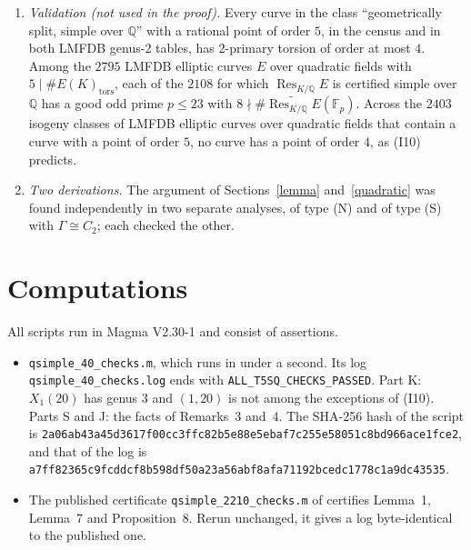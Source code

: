 \documentclass[11pt]{article}
\newcommand{\Q}{\mathbb Q}
\newcommand{\F}{\mathbb F}
\DeclareMathOperator{\Res}{Res}
\begin{document}
\begin{enumerate}
\item \emph{Validation (not used in the proof).} Every curve in the class ``geometrically split,
simple over \(\Q\)'' with a rational point of order \(5\), in the census and in both LMFDB genus-\(2\)
tables, has \(2\)-primary torsion of order at most \(4\). Among the \(2795\) LMFDB elliptic curves \(E\)
over quadratic fields with \(5\mid\#E(K)_{\mathrm{tors}}\), each of the \(2108\) for which
\(\Res_{K/\Q}E\) is certified simple over \(\Q\) has a good odd prime \(p\le23\) with
\(8\nmid\#\widetilde{\Res_{K/\Q}E}(\F_p)\). Across the
\(2403\) isogeny classes of LMFDB elliptic curves over quadratic fields that contain a curve with a
point of order \(5\), no curve has a point of order \(4\), as (I10) predicts.

\item \emph{Two derivations.} The argument of Sections~\ref{lemma} and~\ref{quadratic} was found
independently in two separate analyses, of type (N) and of type (S) with \(\Gamma\cong C_2\); each
checked the other.
\end{enumerate}

\section{Computations}\label{computations}

All scripts run in Magma V2.30-1 and consist of assertions.
\begin{itemize}
\item \texttt{qsimple\_40\_checks.m}, which runs in under a second. Its log
\texttt{qsimple\_40\_checks.log} ends with \texttt{ALL\_T5SQ\_CHECKS\_PASSED}. Part K:
\(X_1(20)\) has genus \(3\) and \((1,20)\) is not among the exceptions of (I10). Parts S and J: the facts of
Remarks~3 and~4. The SHA-256 hash of the script is
\texttt{2a06ab43a45d3617\allowbreak f00cc3ffc82b5e88\allowbreak e5ebaf7c255e5805\allowbreak 1c8bd966ace1fce2}, and that of the log is
\texttt{a7ff82365c9fcddc\allowbreak f8b598df50a23a56\allowbreak abf8afa71192bced\allowbreak c1778c1a9dc43535}.
\item The published certificate \texttt{qsimple\_2210\_checks.m} of \cite{P2210} certifies Lemma~1,
Lemma~7 and Proposition~8. Rerun unchanged, it gives a log byte-identical to the published one.
\end{itemize}
\end{document}

